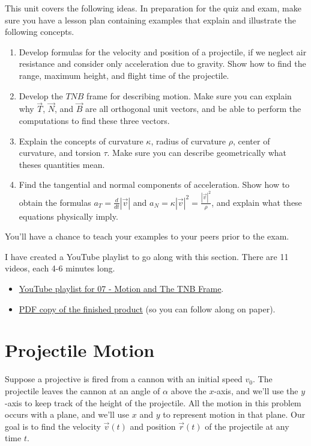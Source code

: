 
\noindent 
This unit covers the following ideas. In preparation for the quiz and exam, make sure you have a lesson plan containing examples that explain and illustrate the following concepts.  
\begin{enumerate}
 \item Develop formulas for the velocity and position of a projectile, if we neglect air resistance and consider only acceleration due to gravity. Show how to find the range, maximum height, and flight time of the projectile.
 \item Develop the $TNB$ frame for describing motion. Make sure you can explain why $\vec T$, $\vec N$, and $\vec B$ are all orthogonal unit vectors, and be able to perform the computations to find these three vectors.
 \item Explain the concepts of curvature $\kappa$, radius of curvature $\rho$, center of curvature, and torsion $\tau$. Make sure you can describe geometrically what theses quantities mean.
 \item Find the tangential and normal components of acceleration. Show how to obtain the formulas $a_T=\frac{d}{dt}|\vec v|$ and $a_N=\kappa |\vec v|^2=\frac{|\vec v|^2}{\rho}$, and explain what these equations physically imply.
\end{enumerate}
You'll have a chance to teach your examples to your peers prior to the exam.

I have created a YouTube playlist to go along with this section. There are 11 videos, each 4-6 minutes long.
\begin{itemize}
 \item \href{http://www.youtube.com/playlist?list=PL30EE81142B1ED1F0&feature=plcp}{YouTube playlist for 07 - Motion and The TNB Frame}.
 \item \href{http://db.tt/FmEGk9p5}{PDF copy of the finished product} (so you can follow along on paper).
\end{itemize}

\section{Projectile Motion}

 Suppose a projective is fired from a cannon with an initial speed $v_0$. The projectile leaves the cannon at an angle of $\alpha$ above the $x$-axis, and we'll use the $y$-axis to keep track of the height of the projectile.  All the motion in this problem occurs with a plane, and we'll use $x$ and $y$ to represent motion in that plane. Our goal is to find the velocity $\vec v(t)$ and position $\vec r(t)$  of the projectile at any time $t$. 

